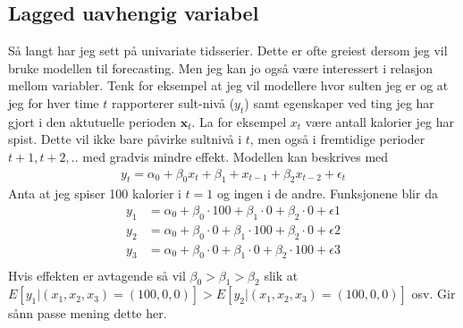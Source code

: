 \subsection{Lagged uavhengig variabel}
Så langt har jeg sett på univariate tidsserier. Dette er ofte greiest dersom jeg vil bruke modellen til forecasting. Men jeg kan jo også være interessert i relasjon mellom variabler. Tenk for eksempel at jeg vil modellere hvor sulten jeg er og at jeg for hver time $t$ rapporterer sult-nivå ($y_t$) samt egenskaper ved ting jeg har gjort i den aktutuelle perioden $\mathbf{x}_t$. La for eksempel $x_t$ være antall kalorier jeg har spist. Dette vil ikke bare påvirke sultnivå i $t$, men også i fremtidige perioder $t+1,t+2,..$ med gradvis mindre effekt. Modellen kan beskrives med
\begin{align}
y_t = \alpha_0 + \beta_0x_t+\beta_1+x_{t-1}+\beta_2x_{t-2}+\epsilon_{t}
\end{align}
Anta at jeg spiser 100 kalorier i $t=1$ og ingen i de andre. Funksjonene blir da
\begin{align}
y_1 &= \alpha_0 + \beta_0\cdot100+\beta_1\cdot0+\beta_2\cdot0+\epsilon{1} \\
y_2&= \alpha_0 + \beta_0\cdot0+\beta_1\cdot100+\beta_2\cdot0+\epsilon{2} \\
y_3&= \alpha_0 + \beta_0\cdot0+\beta_1\cdot0+\beta_2\cdot100+\epsilon{3} \\
\end{align}
Hvis effekten er avtagende så vil $\beta_0>\beta_1>\beta_2$ slik at $E[y_1|(x_1,x_2,x_3)=(100,0,0)]>E[y_2|(x_1,x_2,x_3)=(100,0,0)]$ osv. Gir sånn passe mening dette her.

